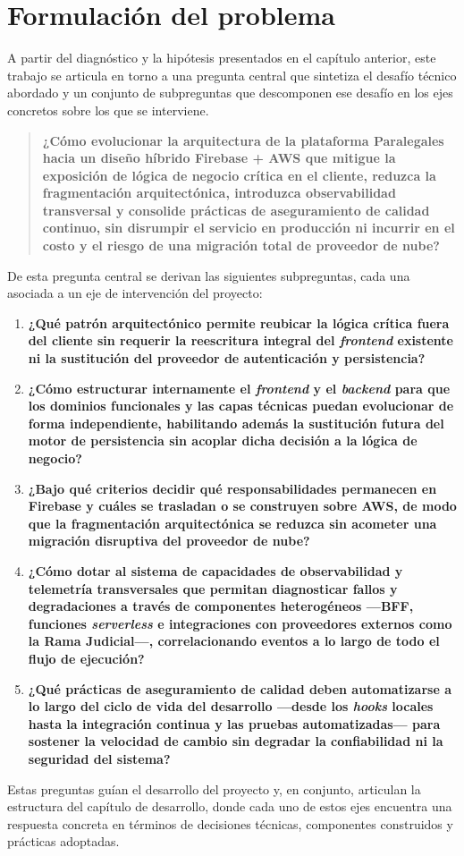 \section{Formulación del problema}

A partir del diagnóstico y la hipótesis presentados en el capítulo anterior, este trabajo se articula en torno a una pregunta central que sintetiza el desafío técnico abordado y un conjunto de subpreguntas que descomponen ese desafío en los ejes concretos sobre los que se interviene.

\begin{quote}
  \textbf{¿Cómo evolucionar la arquitectura de la plataforma Paralegales hacia un diseño híbrido Firebase + AWS que mitigue la exposición de lógica de negocio crítica en el cliente, reduzca la fragmentación arquitectónica, introduzca observabilidad transversal y consolide prácticas de aseguramiento de calidad continuo, sin disrumpir el servicio en producción ni incurrir en el costo y el riesgo de una migración total de proveedor de nube?}
\end{quote}

De esta pregunta central se derivan las siguientes subpreguntas, cada una asociada a un eje de intervención del proyecto:

\begin{enumerate}
  \item \textbf{¿Qué patrón arquitectónico permite reubicar la lógica crítica fuera del cliente sin requerir la reescritura integral del \textit{frontend} existente ni la sustitución del proveedor de autenticación y persistencia?}

  \item \textbf{¿Cómo estructurar internamente el \textit{frontend} y el \textit{backend} para que los dominios funcionales y las capas técnicas puedan evolucionar de forma independiente, habilitando además la sustitución futura del motor de persistencia sin acoplar dicha decisión a la lógica de negocio?}

  \item \textbf{¿Bajo qué criterios decidir qué responsabilidades permanecen en Firebase y cuáles se trasladan o se construyen sobre AWS, de modo que la fragmentación arquitectónica se reduzca sin acometer una migración disruptiva del proveedor de nube?}

  \item \textbf{¿Cómo dotar al sistema de capacidades de observabilidad y telemetría transversales que permitan diagnosticar fallos y degradaciones a través de componentes heterogéneos —BFF, funciones \textit{serverless} e integraciones con proveedores externos como la Rama Judicial—, correlacionando eventos a lo largo de todo el flujo de ejecución?}

  \item \textbf{¿Qué prácticas de aseguramiento de calidad deben automatizarse a lo largo del ciclo de vida del desarrollo —desde los \textit{hooks} locales hasta la integración continua y las pruebas automatizadas— para sostener la velocidad de cambio sin degradar la confiabilidad ni la seguridad del sistema?}
\end{enumerate}

Estas preguntas guían el desarrollo del proyecto y, en conjunto, articulan la estructura del capítulo de desarrollo, donde cada uno de estos ejes encuentra una respuesta concreta en términos de decisiones técnicas, componentes construidos y prácticas adoptadas.
